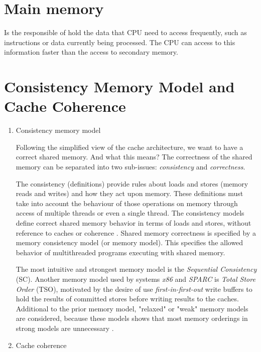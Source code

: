 \documentclass[openany, a4paper]{book}
\theoremstyle{break}
\theoremstyle{example}
\theoremstyle{note}
\theoremstyle{break}
\theoremstyle{exercise}
\begin{document}
\section{Main memory}
\label{sec:orgd7c9667}

Is the responsible of hold the data that CPU need to access frequently, such
as instructions or data currently being processed. The CPU can access to
this information faster than the access to secondary memory.

\section{Consistency Memory Model and Cache Coherence}
\label{sec:orgd6fefc0}

\begin{enumerate}
\item Consistency memory model
\label{sec:org8b3a155}

Following the simplified view of the cache architecture, we want to have a
correct shared memory. And what this means? The correctness of the shared
memory can be separated into two sub-issues: \emph{consistency} and \emph{correctness}.

The consistency (definitions) provide rules about loads and stores (memory
reads and writes) and how they act upon memory. These definitions must take
into account the behaviour of those operations on memory through access of
multiple threads or even a single thread. The consistency models define
correct shared memory behavior in terms of loads and stores, without
reference to caches or coherence \cite{DBLP_series_synthesis_2020Nagarajan}.
Shared memory correctness is specified by a memory consistency model (or
memory model). This specifies the allowed behavior of multithreaded programs
executing with shared memory.

The most intuitive and strongest memory model is the \emph{Sequential Consistency}
(SC). Another memory model used by systems \emph{x86} and \emph{SPARC} is \emph{Total Store Order}
(TSO), motivated by the desire of use \emph{first-in-first-out} write buffers to
hold the results of committed stores before writing results to the caches.
Additional to the prior memory model, "relaxed" or "weak" memory models are
considered, because these models shows that most memory orderings in strong
models are unnecessary \cite{DBLP_series_synthesis_2020Nagarajan}.

\item Cache coherence
\label{sec:org2e36982}


\end{enumerate}
\end{document}
